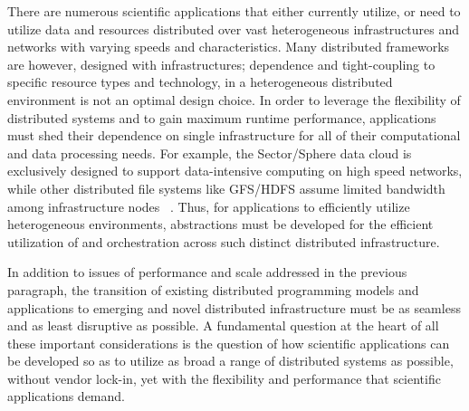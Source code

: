 \documentclass[3p,twocolumn]{elsarticle}
\begin{document}
There are numerous scientific applications that either currently
utilize, or need to utilize data and resources distributed over vast
heterogeneous infrastructures and networks with varying speeds and
characteristics. Many distributed frameworks are however, designed
with infrastructures; dependence and tight-coupling to specific
resource types and technology, in a heterogeneous distributed
environment is not an optimal design choice.
In order to leverage the flexibility of distributed systems and to
gain maximum runtime performance, applications must shed their
dependence on single infrastructure for all of their computational and
data processing needs. For example, the Sector/Sphere data cloud is
exclusively designed to support data-intensive computing on high speed
networks, while other distributed file systems like GFS/HDFS assume
limited bandwidth among infrastructure nodes ~\cite{GFS, HDFS}. Thus,
for applications to efficiently utilize heterogeneous environments,
abstractions must be developed for the efficient utilization of and
orchestration across such distinct distributed infrastructure. 



In addition to issues of performance and scale addressed in the
previous paragraph, the transition of existing distributed programming
models and applications to emerging and novel distributed
infrastructure must be as seamless and as least disruptive as
possible.  A fundamental question at the heart of all these important
considerations is the question of how scientific applications can be
developed so as to utilize as broad a range of distributed systems as
possible, without vendor lock-in, yet with the flexibility and
performance that scientific applications demand.

\end{document}
